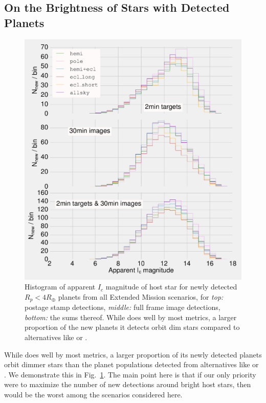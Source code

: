 \subsection{On the Brightness of Stars with Detected Planets}
\begin{figure}[!t]
	\centering
	\includegraphics[]{figures/160729_icmag_t50_nogap_all.pdf}
	\caption{Histogram of apparent $I_c$ magnitude of host star for newly detected $R_p<4R_\oplus$ planets from all Extended Mission scenarios, for \textit{top:} postage stamp detections, \textit{middle:} full frame image detections, \textit{bottom:} the sums thereof.
	While \npole\:does well by most metrics, a larger proportion of the new planets it detects orbit dim stars compared to alternatives like \hemis\:or \shemiAvoid.}
	\label{fig:icmag_meta}
\end{figure}
While \npole\:does well by most metrics, a larger proportion of its newly 
detected planets orbit dimmer stars than the planet populations detected from 
alternatives like \hemis\:or \shemiAvoid.
We demonstrate this in Fig.~\ref{fig:icmag_meta}.
The main point here is that if our only priority were to maximize the number of new detections around bright host stars, then \npole\:would be the worst among the scenarios considered here.
